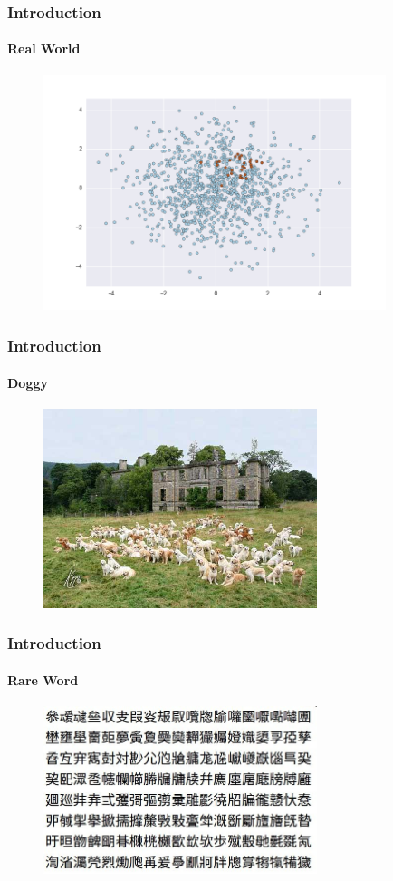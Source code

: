 \documentclass[11 pt,t]{beamer}
\begin{document}
\begin{frame}
\frametitle{Introduction}
\framesubtitle{Real World}
\begin{minipage}[t]{\linewidth}\centering
\begin{figure}
   \includegraphics[width=10cm]{messy}
\end{figure}
\end{minipage}
\end{frame}


\begin{frame}
\frametitle{Introduction}
\framesubtitle{Doggy}
\begin{minipage}[t]{\linewidth}\centering
\begin{figure}
   \includegraphics[width=8cm]{dog}
\end{figure}
\end{minipage}
\end{frame}

\begin{frame}
\frametitle{Introduction}
\framesubtitle{Rare Word}
\begin{minipage}[t]{\linewidth}\centering
\begin{figure}
   \includegraphics[width=8cm]{shengpizi}
\end{figure}
\end{minipage}
\end{frame}
\end{document}
